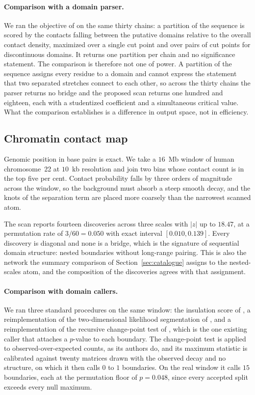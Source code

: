 \documentclass[11pt]{article}
\theoremstyle{definition}
\newcommand{\1}{\mathbf 1}\newcommand{\op}{\operatorname}
\begin{document}
\paragraph{Comparison with a domain parser.}
We ran the objective of \citet{zheng2020} on the same thirty chains: a partition
of the sequence is scored by the contacts falling between the putative domains
relative to the overall contact density, maximized over a single cut point and
over pairs of cut points for discontinuous domains.  It returns one partition
per chain and no significance statement.  The comparison is therefore not one of
power.  A partition of the sequence assigns every residue to a domain and
cannot express the statement that two separated stretches connect to each
other, so across the thirty chains the parser returns no bridge and the proposed
scan returns one hundred and eighteen, each with a studentized coefficient and a
simultaneous critical value.  What the
comparison establishes is a difference in output space, not in efficiency.  

\subsection{Chromatin contact map}          \label{sec:hic}

Genomic position in base pairs is exact.  We take a $16$~Mb window of human
chromosome~22 at $10$~kb resolution and join two bins whose contact count is
in the top five per cent.  Contact probability falls by three orders of
magnitude across the window, so the background must absorb a steep smooth
decay, and the knots of the separation term are placed more coarsely than the
narrowest scanned atom.

The scan reports fourteen discoveries across three scales with $|z|$ up to
$18.47$, at a permutation rate of $3/60=0.050$ with exact interval
$[0.010,0.139]$.  Every discovery is diagonal and none is a bridge, which is
the signature of sequential domain structure: nested boundaries without
long-range pairing.  This is also the network the summary comparison of
Section~\ref{sec:catalogue} assigns to the nested-scales atom, and the
composition of the discoveries agrees with that assignment.

\paragraph{Comparison with domain callers.}
We ran three standard procedures on the same window: the insulation score of
\citet{crane2015}, a reimplementation of the two-dimensional likelihood
segmentation of \citet{levyleduc2014}, and a reimplementation of the
recursive change-point test of \citet{xing2021}, which is the one existing
caller that attaches a $p$-value to each boundary.  The change-point test is
applied to observed-over-expected counts, as its authors do, and its maximum
statistic is calibrated against twenty matrices drawn with the observed
decay and no structure, on which it then calls $0$ to $1$ boundaries.  On the
real window it calls $15$ boundaries, each at the permutation floor of
$p=0.048$, since every accepted split exceeds every null maximum.
\end{document}
